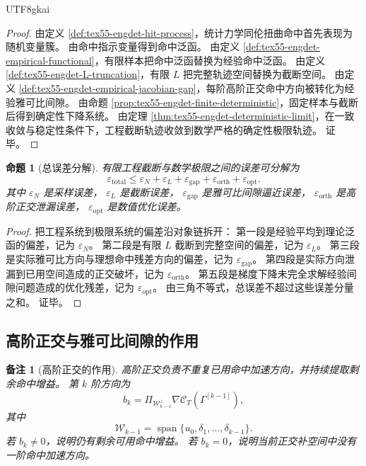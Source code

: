 \documentclass[12pt]{article}
\newtheorem{proposition}{命题}[section]
\newtheorem{remark}{备注}[section]
\begin{document}
\begin{CJK*}{UTF8}{gkai}
\begin{proof}
由定义 \ref{def:tex55-engdet-hit-process}，统计力学同伦扭曲命中首先表现为随机变量簇。
由命中指示变量得到命中泛函。
由定义 \ref{def:tex55-engdet-empirical-functional}，有限样本把命中泛函替换为经验命中泛函。
由定义 \ref{def:tex55-engdet-L-truncation}，有限 \(L\) 把完整轨迹空间替换为截断空间。
由定义 \ref{def:tex55-engdet-empirical-jacobian-gap}，每阶高阶正交命中方向被转化为经验雅可比间隙。
由命题 \ref{prop:tex55-engdet-finite-deterministic}，固定样本与截断后得到确定性下降系统。
由定理 \ref{thm:tex55-engdet-deterministic-limit}，在一致收敛与稳定性条件下，工程截断轨迹收敛到数学严格的确定性极限轨迹。
证毕。
\end{proof}

\begin{proposition}[总误差分解]
\label{prop:tex55-engdet-total-error}
有限工程截断与数学极限之间的误差可分解为
\[
  \boxed{
  \varepsilon_{\mathrm{total}}
  \le
  \varepsilon_N
  +
  \varepsilon_L
  +
  \varepsilon_{\mathrm{gap}}
  +
  \varepsilon_{\mathrm{orth}}
  +
  \varepsilon_{\mathrm{opt}}.
  }
\]
其中 \(\varepsilon_N\) 是采样误差，
\(\varepsilon_L\) 是截断误差，
\(\varepsilon_{\mathrm{gap}}\) 是雅可比间隙逼近误差，
\(\varepsilon_{\mathrm{orth}}\) 是高阶正交泄漏误差，
\(\varepsilon_{\mathrm{opt}}\) 是数值优化误差。
\end{proposition}

\begin{proof}
把工程系统到极限系统的偏差沿对象链拆开：
第一段是经验平均到理论泛函的偏差，记为 \(\varepsilon_N\)。
第二段是有限 \(L\) 截断到完整空间的偏差，记为 \(\varepsilon_L\)。
第三段是实际雅可比方向与理想命中残差方向的偏差，记为 \(\varepsilon_{\mathrm{gap}}\)。
第四段是实际方向泄漏到已用空间造成的正交破坏，记为 \(\varepsilon_{\mathrm{orth}}\)。
第五段是梯度下降未完全求解经验间隙问题造成的优化残差，记为 \(\varepsilon_{\mathrm{opt}}\)。
由三角不等式，总误差不超过这些误差分量之和。
证毕。
\end{proof}

\subsection{高阶正交与雅可比间隙的作用}
\label{subsec:tex55-engdet-role}

\begin{remark}[高阶正交的作用]
高阶正交负责不重复已用命中加速方向，并持续提取剩余命中增益。
第 \(k\) 阶方向为
\[
  b_k
  =
  \Pi_{\mathcal W_{k-1}^{\perp}}
  \nabla\mathcal C_T(\Gamma^{[k-1]}),
\]
其中
\[
  \mathcal W_{k-1}
  =
  \operatorname{span}\{u_0,\delta_1,\ldots,\delta_{k-1}\}.
\]
若 \(b_k\neq0\)，说明仍有剩余可用命中增益。
若 \(b_k=0\)，说明当前正交补空间中没有一阶命中加速方向。
\end{remark}


\end{CJK*}
\end{document}
